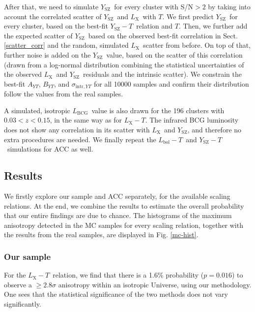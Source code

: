\documentclass{aa}   %
\newcommand{\LT}{$L_{\text{X}}-T$}
\newcommand{\YT}{$Y_{\text{SZ}}-T$}
\newcommand{\Lx}{$L_{\text{X}}$}
\newcommand{\Ysz}{$Y_{\text{SZ}}$}
\newcommand{\Lbcg}{$L_{\text{BCG}}$}
\newcommand{\LbolT}{$L_{\text{bol}}-T$}
\begin{document}

After that, we need to simulate \Ysz\ for every cluster with S/N$>2$ by taking into account the correlated scatter of \Ysz\ and \Lx\ with $T$. We first predict \Ysz\ for every cluster, based on the best-fit \YT\ relation and $T$. Then, we further add the expected scatter of \Ysz\ based on the observed best-fit correlation in Sect. \ref{scatter_corr} and the random, simulated \Lx\ scatter from before. On top of that, further noise is added on the \Ysz\ value, based on the scatter of this correlation (drawn from a log-normal distribution combining the statistical uncertainties of the observed \Lx\ and \Ysz\ residuals and the intrinsic scatter). We constrain the best-fit $A_{YT}$, $B_{YT}$, and $\sigma_{\text{intr},YT}$ for all 10000 samples and confirm their distribution follow the values from the real samples.

A simulated, isotropic \Lbcg\ value is also drawn for the 196 clusters with $0.03<z<0.15$, in the same way as for \LT. The infrared BCG luminosity does not show any correlation in its scatter with \Lx\ and \Ysz, and therefore no extra procedures are needed. We finally repeat the \LbolT\ and \YT\ simulations for ACC as well.

\subsection{Results}

We firstly explore our sample and ACC separately, for the available scaling relations. At the end, we combine the results to estimate the overall probability that our entire findings are due to chance. The histograms of the maximum anisotropy detected in the MC samples for every scaling relation, together with the results from the real samples, are displayed in Fig. \ref{mc-hist}.

\subsubsection{Our sample}

For the \LT\ relation, we find that there is a 1.6\% probability ($p=0.016$) to observe a $\geq 2.8\sigma$ anisotropy within an isotropic Universe, using our methodology. One sees that the statistical significance of the two methods does not vary significantly. 
\end{document}
